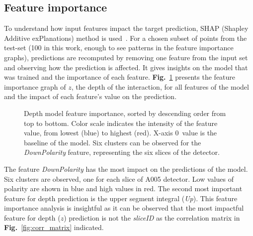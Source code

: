 \subsection{Feature importance}

To understand how input features impact the target prediction, SHAP (Shapley Additive exPlanations) method is used~\cite{lundberg2017}. For a chosen subset of points from the test-set (100 in this work, enough to see patterns in the feature importance graphs), predictions are recomputed by removing one feature from the input set and observing how the prediction is affected. It gives insights on the model that was trained and the importance of each feature. \textbf{Fig.}~\ref{fig:detph_treeSHAP} presents the feature importance graph of $z$, the depth of the interaction, for all features of the model and the impact of each feature's value on the prediction.

\begin{figure}
\centering
{}
\caption{Depth model feature importance, sorted by descending order from top to bottom. Color scale indicates the intensity of the feature value, from lowest (blue) to highest (red). X-axis 0~value is the baseline of the model. Six clusters can be observed for the \textit{DownPolarity} feature, representing the six slices of the detector.} 
\label{fig:detph_treeSHAP}       %
\end{figure}

The feature \textit{DownPolarity} has the most impact on the predictions of the model. Six clusters are observed, one for each slice of A005 detector. Low values of polarity are shown in blue and high values in red. The second most important feature for depth prediction is the upper segment integral (\textit{Up}). This feature importance analysis is insightful as it can be observed that the most impactful feature for depth ($z$) prediction is not the \textit{sliceID} as the correlation matrix in \textbf{Fig.}~\ref{fig:corr_matrix} indicated.

